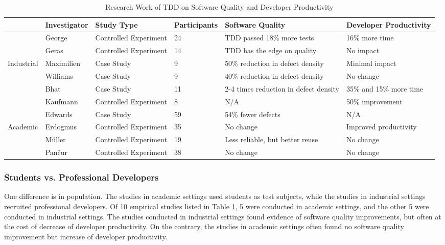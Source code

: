 \documentclass[smallextended]{svjour3}     %
\begin{document}
\begin{table}
\centering
  \begin{tabular}{|l|l|l|l|l|l|} \hline 
 & Investigator	& Study Type & Participants	& Software Quality	& Developer Productivity \\ \hline
 & George \cite{George:03} & Controlled Experiment	& 24	& TDD passed 18\% more tests & 16\% more time \\ \cline{2-6}
 & Geras \cite{Geras:04}  &  Controlled Experiment & 14	& TDD has the edge on quality & No impact \\ \cline{2-6}
 Industrial
 & Maximilien	\cite{Maximilien:03} & Case Study &  9	& 50\% reduction in defect density	& Minimal impact \\ \cline{2-6}
 & Williams\cite{Williams:03} & Case Study & 9	& 40\% reduction in defect density	& No change \\ \cline{2-6}
 & Bhat	\cite{Bhat:06}  & Case Study & 11	& 2-4 times reduction in defect density	& 35\% and 15\% more time \\ 
 
 \hline \hline
 
         & Kaufmann \cite{Kaufmann:03}	& Controlled Experiment &  8	& N/A	    & 50\% improvement \\ \cline{2-6}
         & Edwards \cite{Edwards:04} & Case Study & 59	& 54\% fewer defects	& N/A \\ \cline{2-6}
Academic & Erdogmus	\cite{Erdogmus:05} & Controlled Experiment & 35	& No change	  & Improved productivity \\ \cline{2-6}
         & M\"{u}ller \cite{Muller:02} & Controlled Experiment & 19 & Less reliable, but better reuse	& No change \\ \cline{2-6}
         & Pan\v{c}ur	\cite{Matjaz:03} & Controlled Experiment & 38	& No change	  & No change \\ \hline
  \end{tabular}
  \caption{Research Work of TDD on Software Quality and Developer Productivity}
  \label{tab:TDDResearchWork2}
\end{table}


\subsubsection{Students vs. Professional Developers}
One difference is in population. The studies in academic settings 
used students as test subjects, while the studies in industrial 
settings recruited professional developers. 
Of 10 empirical studies listed in Table \ref{tab:TDDResearchWork2},
5 were conducted in academic settings, and the other 5 were 
conducted in industrial settings. The 
studies conducted in industrial settings found evidence of 
software quality improvements, but often at the cost of 
decrease of developer productivity. On the contrary, the 
studies in academic settings often found no software quality 
improvement but increase of developer productivity. 
\end{document}
